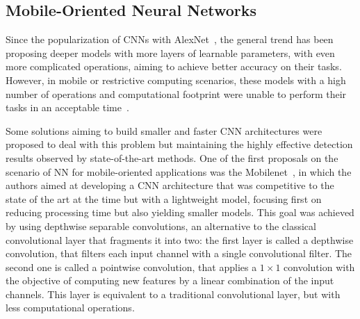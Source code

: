 \subsection{Mobile-Oriented Neural Networks}


Since the popularization of CNNs with AlexNet~\cite{alexnet}, the general trend has been proposing deeper models with more layers of learnable parameters, with even more complicated operations, aiming to achieve better accuracy on their tasks. However, in mobile or restrictive computing scenarios, these models with a high number of operations and computational footprint were unable to perform their tasks in an acceptable time~\cite{Howard2017CoRR}. 

Some solutions aiming to build smaller and faster CNN architectures were proposed to deal with this problem but maintaining the highly effective detection results observed by state-of-the-art methods. One of the first proposals on the scenario of NN for mobile-oriented applications was the Mobilenet~\cite{Howard2017CoRR}, in which the authors aimed at developing a CNN architecture that was competitive to the state of the art at the time but with a lightweight model, focusing first on reducing processing time but also yielding smaller models. This goal was achieved by using depthwise separable convolutions, an alternative to the classical convolutional layer that fragments it into two: the first layer is called a depthwise convolution, that filters each input channel with a single convolutional filter. The second one is called a pointwise convolution, that applies a $1 \times 1$ convolution with the objective of computing new features by a linear combination of the input channels. This layer is equivalent to a traditional convolutional layer, but with less computational operations.

